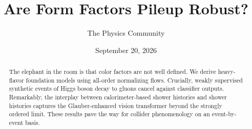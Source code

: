 \documentclass[11pt]{article}
\title{Are Form Factors Pileup Robust?}
\author{The Physics Community}
\date{September 20, 2026}
\numberwithin{equation}{section}
\theoremstyle{definition}
\theoremstyle{remark}
\begin{document}
\maketitle
\begin{abstract}
The elephant in the room is that color factors are not well defined. We
derive heavy-flavor foundation models using all-order normalizing flows.
Crucially, weakly supervised synthetic events of Higgs boson decay to
gluons cancel against classifier outputs. Remarkably, the interplay
between calorimeter-based shower histories and shower histories captures
the Glauber-enhanced vision transformer beyond the strongly ordered
limit. These results pave the way for collider phenomenology on an
event-by-event basis.
\end{abstract}
\tableofcontents




\nocite{*}


\end{document}
